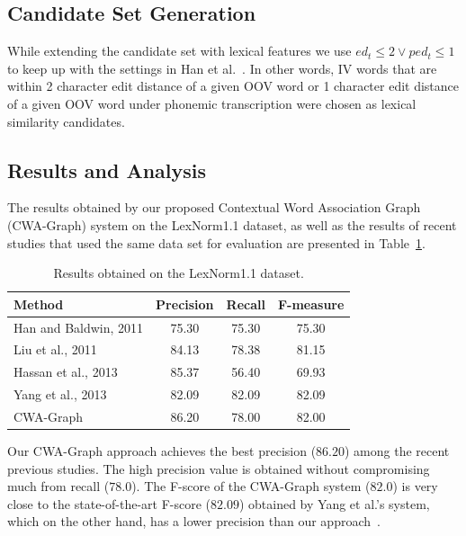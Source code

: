 \documentclass[preprint,review,12pt]{elsarticle}
\begin{document}
\subsection{Candidate Set Generation}

While extending the candidate set with lexical features we use ${ed_t \leq 2} \vee {ped_t \leq 1}$ to keep up with the settings in Han et al.~\cite{Han:2011:LNS:2002472.2002520}. In other words, IV words that are within 2 character edit distance of a given OOV word or 1 character edit distance of a given OOV word under phonemic transcription were chosen as lexical similarity candidates.

\subsection{Results and Analysis}

The results obtained by our proposed Contextual Word Association Graph (CWA-Graph) system on the LexNorm1.1 dataset,
as well as the results of recent studies that used the same data set for evaluation are presented in Table~\ref{tab:results}.

\begin{table}[thb]
  \centering
  \begin{tabular}[t]{lccc}
    \hline
    Method & Precision & Recall & F-measure \\
    \hline
    Han and Baldwin, 2011 & 75.30 & 75.30 & 75.30 \\
    Liu et al., 2011 & 84.13 & 78.38 & 81.15 \\
    Hassan et al., 2013 & 85.37 & 56.40 & 69.93 \\
    Yang et al., 2013 & 82.09 & 82.09 & 82.09 \\
    CWA-Graph   & 86.20 & 78.00 & 82.00 \\
    \hline
  \end{tabular}
  \caption{Results obtained on the LexNorm1.1 dataset.}
  \label{tab:results}
\end{table}

Our CWA-Graph approach achieves the best precision ($86.20$) among the recent previous studies. The high precision value is obtained without compromising much from recall ($78.0$). The F-score of the CWA-Graph system ($82.0$) is very close to the state-of-the-art F-score ($82.09$) obtained by Yang et al.'s system, which on the other hand, has a lower precision than our approach~\cite{DBLP:conf/emnlp/YangE13}.
\end{document}
